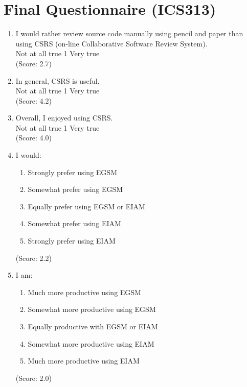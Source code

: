 
\chapter {Final Questionnaire (ICS313) }

\begin{enumerate}

\item  I would rather review source code manually using pencil and paper than
using CSRS (on-line Collaborative Software Review System).
\\
Not at all true \hfill 1     \hfill Very true\\
(Score: 2.7)

\item  In general, CSRS is useful.
\\
Not at all true \hfill 1     \hfill Very true\\
(Score: 4.2)

\item  Overall, I enjoyed using CSRS.
\\
Not at all true \hfill 1    
\hfill Very true\\
(Score: 4.0)

\item I would:
    \begin{enumerate}
   \item[(1)]Strongly prefer using EGSM
   \item[(2)]Somewhat prefer using EGSM
   \item[(3)]Equally prefer using EGSM or EIAM
   \item[(4)]Somewhat prefer using EIAM
   \item[(5)]Strongly prefer using EIAM
   \end{enumerate}
(Score: 2.2)

\item I am:
    \begin{enumerate}
     \item[(1)] Much more productive using EGSM
     \item[(2)] Somewhat more productive using EGSM
     \item[(3)] Equally productive with EGSM or EIAM
     \item[(4)] Somewhat more productive using EIAM
     \item[(5)] Much more productive using EIAM
     \end{enumerate}   
(Score: 2.0)


\end{enumerate}
